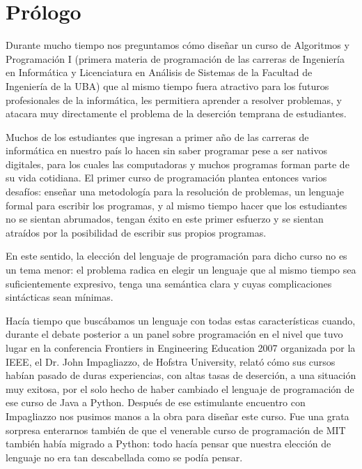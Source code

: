
%

\chapter*{Prólogo}

Durante mucho tiempo nos preguntamos cómo diseñar un curso de Algoritmos y Programación I 
(primera materia de programación de las carreras de Ingeniería en Informática y Licenciatura 
en Análisis de Sistemas de la Facultad de Ingeniería de la UBA) que al mismo tiempo fuera 
atractivo para los futuros profesionales de la informática, les permitiera aprender a resolver 
problemas, y atacara muy directamente el problema de la deserción temprana de estudiantes.


Muchos de los estudiantes que ingresan a primer año de las carreras de informática en nuestro 
país lo hacen sin saber programar pese a ser nativos digitales, para los cuales las computadoras 
y muchos programas forman parte de su vida cotidiana. El primer curso de programación plantea 
entonces varios desafíos: enseñar una metodología para la resolución de problemas, un lenguaje 
formal para escribir los programas, y al mismo tiempo hacer que los estudiantes no se sientan 
abrumados, tengan éxito en este primer esfuerzo y se sientan atraídos por la posibilidad de 
escribir sus propios programas.


En este sentido, la elección del lenguaje de programación para dicho curso no es un tema menor: 
el problema radica en elegir un lenguaje que al mismo tiempo sea suficientemente expresivo, tenga 
una semántica clara y cuyas complicaciones sintácticas sean mínimas.


Hacía tiempo que buscábamos un lenguaje con todas estas características cuando, durante el debate 
posterior a un panel sobre programación en el nivel que tuvo lugar en la conferencia Frontiers in 
Engineering Education 2007 organizada por la IEEE, el Dr. John Impagliazzo, de Hofstra University, 
relató cómo sus cursos habían pasado de duras experiencias, con altas tasas de deserción, a una 
situación muy exitosa, por el solo hecho de haber cambiado el lenguaje de programación de ese curso 
de Java a Python. Después de ese estimulante encuentro con Impagliazzo nos pusimos manos a la obra 
para diseñar este curso. Fue una grata sorpresa enterarnos también de que el venerable curso de 
programación de MIT también había migrado a Python: todo hacía pensar que nuestra elección de lenguaje 
no era tan descabellada como se podía pensar.


